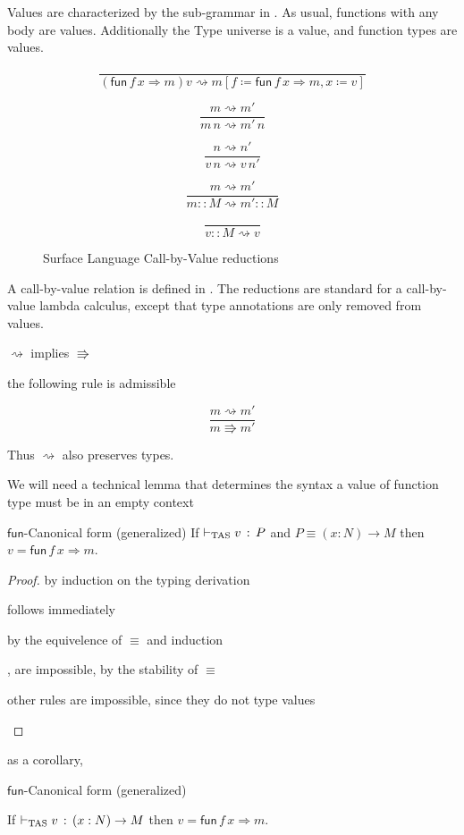 Values are characterized by the sub-grammar in .
As usual, functions with any body are values.
Additionally the Type universe is a value, and function types are values.

\begin{figure}
\[
\frac{\,}{\left(\mathsf{fun}\,f\,x\Rightarrow m\right)v\rightsquigarrow m\left[f\coloneqq\mathsf{fun}\,f\,x\Rightarrow m,x\coloneqq v\right]}
\]

\[
\frac{m\rightsquigarrow m'}{m\,n\rightsquigarrow m'\,n}
\]

\[
\frac{n\rightsquigarrow n'}{v\,n\rightsquigarrow v\,n'}
\]

\[
\frac{m\rightsquigarrow m'}{m::M\rightsquigarrow m'::M}
\]

\[
\frac{\,}{v::M\rightsquigarrow v}
\]

\caption{Surface Language Call-by-Value reductions}
\label{fig:surface-reduction-step}
\end{figure}

A call-by-value relation is defined in .
The reductions are standard for a call-by-value lambda calculus, except that type annotations are only removed from values.

\begin{fact}
$\rightsquigarrow$ implies $\Rrightarrow$

the following rule is admissible

\[
\frac{m\rightsquigarrow m'}{m\Rrightarrow m'}
\]
\end{fact}

Thus $\rightsquigarrow$ also preserves types.

We will need a technical lemma that determines the syntax a value of function type must be in an empty context

\begin{lem}
  $\mathsf{fun}$-Canonical form (generalized)
  If $\vdash_{\mathrm{TAS}} v\,:\,P$ and $P\equiv\left(x:N\right)\rightarrow M$ then $v=\mathsf{fun}\,f\,x\Rightarrow m$.
\end{lem}
\begin{proof}
by induction on the typing derivation

\begin{casenv}
\item {} follows immediately
\item {} by the equivelence of $\equiv$ and induction
\item {},  are impossible, by the stability of $\equiv$
\item other rules  are impossible, since they do not type values
\end{casenv}
\end{proof}
as a corollary,
\begin{cor}
$\mathsf{fun}$-Canonical form (generalized)

If $\vdash_{\mathrm{TAS}} v\,:\,\left(x:N\right)\rightarrow M$ then \textup{$v=\mathsf{fun}\,f\,x\Rightarrow m$.}
\end{cor}

